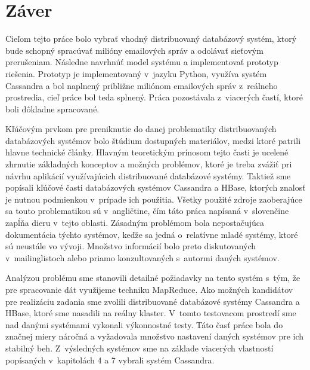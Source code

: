 \documentclass[11pt,twoside,a4paper]{book}
\begin{document}
\chapter{Záver}


Cieľom tejto práce bolo vybrať vhodný distribuovaný databázový systém, ktorý bude schopný spracúvať milióny emailových správ a odolávať sieťovým prerušeniam. Následne navrhnúť model systému a implementovať prototyp riešenia. Prototyp je implementovaný v~jazyku Python, využíva systém Cassandra a bol naplnený približne miliónom emailových správ z~reálneho prostredia, cieľ práce bol teda splnený. Práca pozostávala z~viacerých častí, ktoré boli dôkladne spracované.

Kľúčovým prvkom pre preniknutie do danej problematiky distribuovaných databázových systémov bolo štúdium dostupných materiálov, medzi ktoré patrili hlavne technické články. Hlavným teoretickým prínosom tejto časti je ucelené zhrnutie základných konceptov a možných problémov, ktoré je treba zvážiť pri návrhu aplikácií využívajúcich distribuované databázové systémy. Taktiež sme popísali kľúčové časti databázových systémov Cassandra a HBase, ktorých znalosť je nutnou podmienkou v~prípade ich použitia. Všetky použité zdroje zaoberajúce sa touto problematikou sú v~angličtine, čím táto práca napísaná v~slovenčine zapĺňa dieru v~tejto oblasti. Zásadným problémom bola nepostačujúca dokumentácia týchto systémov, keďže sa jedná o~relatívne mladé systémy, ktoré sú neustále vo vývoji. Množstvo informácií bolo preto diskutovaných v~mailinglistoch alebo priamo konzultovaných s~autormi daných systémov.

Analýzou problému sme stanovili detailné požiadavky na tento systém s~tým, že pre spracovanie dát využijeme techniku MapReduce. Ako možných kandidátov pre realizáciu zadania sme zvolili distribuované databázové systémy Cassandra a HBase, ktoré sme nasadili na reálny klaster. V~tomto testovacom prostredí sme nad danými systémami vykonali výkonnostné testy. Táto časť práce bola do značnej miery náročná a vyžadovala množstvo nastavení daných systémov pre ich stabilný beh. Z~výsledných systémov sme na základe viacerých vlastností popísaných v~kapitolách 4 a 7 vybrali systém Cassandra.
\end{document}

